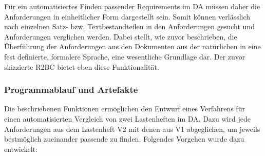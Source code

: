 \documentclass[12pt]{report}
\begin{document}
Für ein automatisiertes Finden passender Requirements im DA müssen daher die Anforderungen in einheitlicher Form dargestellt sein. Somit können verlässlich nach einzelnen Satz- bzw. Textbestandteilen in den Anforderungen gesucht und Anforderungen verglichen werden.
Dabei stellt, wie zuvor beschrieben, die Überführung der Anforderungen aus den Dokumenten aus der natürlichen in eine fest definierte, formalere Sprache, eine wesentliche Grundlage dar. Der zuvor skizzierte R2BC bietet eben diese Funktionalität.

\subsubsection{Programmablauf und Artefakte}
Die beschriebenen Funktionen ermöglichen den Entwurf eines Verfahrens für einen automatisierten Vergleich von zwei Lastenheften im DA. Dazu wird jede Anforderungen aus dem Lastenheft V2 mit denen aus V1 abgeglichen, um jeweils bestmöglich zueinander passende zu finden.
Folgendes Vorgehen wurde dazu entwickelt:
\end{document}
